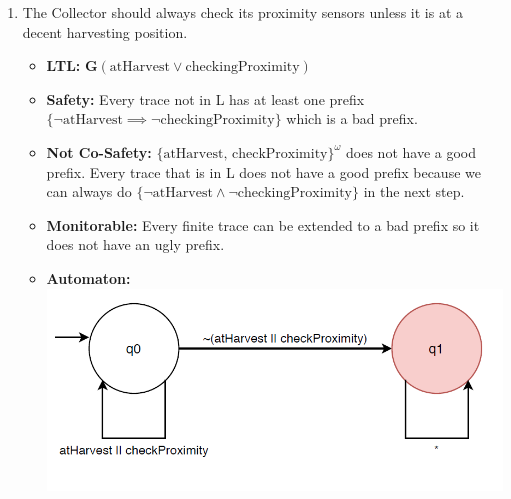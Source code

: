 \documentclass[12pt]{article}
\begin{document}
\begin{enumerate}
\item The Collector should always check its proximity sensors unless it is at a decent harvesting position.
	\begin{itemize}
		\item \textbf{LTL:} $\mathbf{G}(\text{atHarvest} \lor \text{checkingProximity})$
		\item \textbf{Safety:} Every trace not in L has at least one prefix \\
		$\{ \neg \text{atHarvest}  \implies \neg \text{checkingProximity}\}$ which is a bad prefix.
		\item \textbf{Not Co-Safety:} $\{ \text{atHarvest, checkProximity}\}^ {\omega}$ does not have a good prefix. Every trace that is in L does not have a good prefix because we can always do $\{ \neg \text{atHarvest}  \land \neg \text{checkingProximity}\}$ in the next step.
		\item \textbf{Monitorable:} Every finite trace can be extended to a bad prefix so it does not have an ugly prefix.
		\item \textbf{Automaton:} \\
			\includegraphics[scale = 0.5]{images/checkProximityAutomaton}
	\end{itemize}		
	

\end{enumerate}
\end{document}
